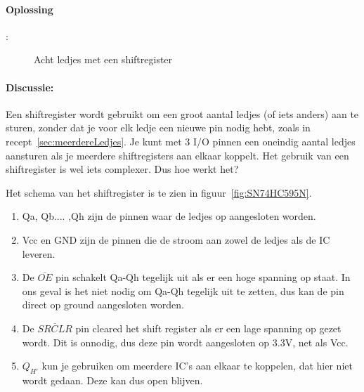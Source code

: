 	\paragraph{Oplossing}:
	\begin{figure}[H]
		\caption{Acht ledjes met een shiftregister}
		\label{fig:ShiftRegister}
	\end{figure}
	
	\clearpage
	\newpage
	
	
	\newpage
	\paragraph{Discussie:} Een shiftregister wordt gebruikt om een groot aantal ledjes (of iets anders) aan te sturen, zonder dat je voor elk ledje een nieuwe pin nodig hebt, zoals in recept~\ref{sec:meerdereLedjes}. Je kunt met 3 I/O pinnen een oneindig aantal ledjes aansturen als je meerdere shiftregisters aan elkaar koppelt. Het gebruik van een shiftregister is wel iets complexer. Dus hoe werkt het?
	
	Het schema van het shiftregister is te zien in figuur~\ref{fig:SN74HC595N}. 
	\begin{enumerate}
		\item Qa, Qb.... ,Qh zijn de pinnen waar de ledjes op aangesloten worden.
		\item Vcc en GND zijn de pinnen die de stroom aan zowel de ledjes als de IC leveren.
		\item De $\overline{OE}$ pin schakelt Qa-Qh tegelijk uit als er een hoge spanning op staat. In ons geval is het niet nodig om Qa-Qh tegelijk uit te zetten, dus kan de pin direct op ground aangesloten worden.
		\item De $\overline{SRCLR}$ pin cleared het shift register als er een lage spanning op gezet wordt. Dit is onnodig, dus deze pin wordt aangesloten op 3.3V, net als Vcc.
		\item $Q_{H'}$ kun je gebruiken om meerdere IC's aan elkaar te koppelen, dat hier niet wordt gedaan. Deze kan dus open blijven.
	\end{enumerate}  
	
